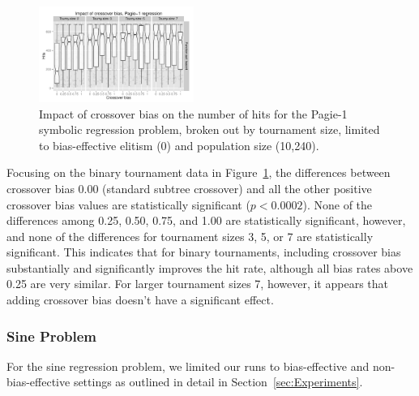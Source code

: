 \documentclass{sig-alternate}
\begin{document}
\begin{figure}[tb]
\centering
\includegraphics[width=0.45\textwidth]
{Plots/Pagie_1_strong_No_Tarpeian_Hits_vs_Bias_Tournys_FunctionSet.pdf}
\caption{Impact of crossover bias on the number of hits for the Pagie-1 symbolic regression problem, 
	broken out by tournament size, limited to bias-effective elitism (0) and population size (10,240).}
\label{fig:Pagie1StrongHits_Bias_Tournys_FunctionSet}
\end{figure}

Focusing on the binary tournament data in Figure~\ref{fig:Pagie1StrongHits_Bias_Tournys_FunctionSet}, the differences
between crossover bias 0.00 (standard subtree crossover) and all the other positive crossover bias values are
statistically significant ($p<0.0002$). 
None of the differences among 0.25, 0.50, 0.75, and 1.00 are statistically significant, however, and
none of the differences for tournament sizes 3, 5, or 7 are statistically significant. This indicates that for binary
tournaments, including crossover bias substantially and significantly improves the hit rate, although all bias rates
above 0.25 are very similar. For larger tournament sizes 7, however, it appears that adding crossover bias doesn't have a significant effect.

%
%
%
%

\subsubsection{Sine Problem}
\label{sec:sineRegression}

For the sine regression problem, we limited our runs to bias-effective and non-bias-effective settings as outlined in
detail in Section~\ref{sec:Experiments}.
\end{document}

